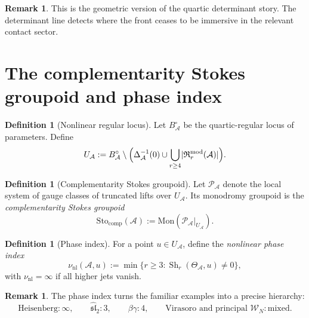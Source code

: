 \documentclass[11pt,oneside]{memoir}
\numberwithin{equation}{chapter}
\theoremstyle{definition}
\newtheorem{definition}[theorem]{Definition}
\newtheorem{remark}[theorem]{Remark}
\newcommand{\cA}{\mathcal A}
\newcommand{\Sh}{\operatorname{Sh}}
\begin{document}
\begin{remark}
This is the geometric version of the quartic determinant story.  The determinant line detects where the front ceases to be immersive in the relevant contact sector.
\end{remark}

\section{The complementarity Stokes groupoid and phase index}

\begin{definition}[Nonlinear regular locus]
\label{def:nonlinear-regular-locus}
Let \(B_{\cA}^{\circ}\) be the quartic-regular locus of parameters.  Define
\begin{equation}
\label{eq:nonlinear-regular-locus}
U_{\cA}
:=
B_{\cA}^{\circ}\setminus
\Bigl(
\Delta_{\cA}^{-1}(0)
\cup
\bigcup_{r\ge 4}\lvert \mathfrak R^{\mathrm{mod}}_{r}(\cA)\rvert
\Bigr).
\end{equation}
\end{definition}

\begin{definition}[Complementarity Stokes groupoid]
\label{def:stokes-groupoid}
Let \(\mathscr P_{\cA}\) denote the local system of gauge classes of truncated lifts over \(U_{\cA}\).  Its monodromy groupoid is the \emph{complementarity Stokes groupoid}
\begin{equation}
\label{eq:stokes-groupoid}
\mathrm{Sto}_{\mathrm{comp}}(\cA):=\mathrm{Mon}(\mathscr P_{\cA}|_{U_{\cA}}).
\end{equation}
\end{definition}

\begin{definition}[Phase index]
\label{def:phase-index}
For a point \(u\in U_{\cA}\), define the \emph{nonlinear phase index}
\begin{equation}
\label{eq:phase-index}
\nu_{\mathrm{nl}}(\cA,u)
:=
\min\{r\ge 3:\Sh_r(\Theta_{\cA},u)\neq 0\},
\end{equation}
with \(\nu_{\mathrm{nl}}=\infty\) if all higher jets vanish.
\end{definition}

\begin{remark}
The phase index turns the familiar examples into a precise hierarchy:
\[
\text{Heisenberg}:\infty,
\qquad
\widehat{\mathfrak{sl}}_2:3,
\qquad
\beta\gamma:4,
\qquad
\text{Virasoro and principal }\mathcal W_N:\text{mixed}.
\]
\end{remark}
\end{document}
